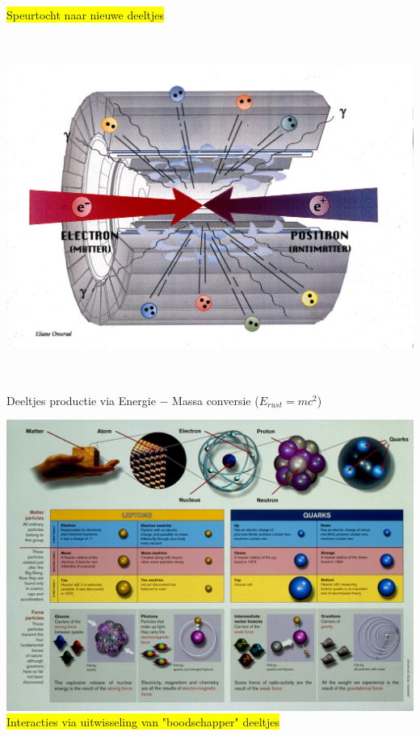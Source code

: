 \Tr
\onecolumn
\begin{center}
\colorbox{yellow}{Speurtocht naar nieuwe deeltjes}\\[1cm]
\includegraphics[keepaspectratio,height=12cm]{collision}\\
Deeltjes productie via Energie $-$ Massa conversie ({\blue $E_{rust}=mc^{2}$})
\end{center}

\Tr
\onecolumn
\begin{center}
\includegraphics[keepaspectratio,width=20cm]{matter}\\
\colorbox{yellow}{Interacties via uitwisseling van "boodschapper" deeltjes}
\end{center}

